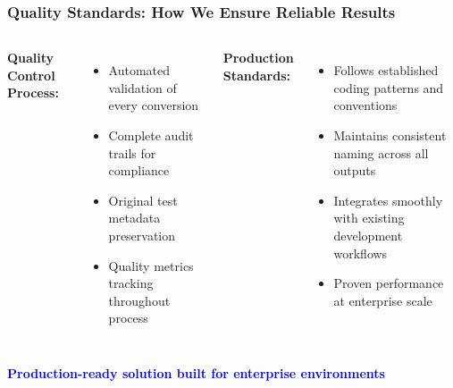 \begin{frame}
\frametitle{Quality Standards: How We Ensure Reliable Results}
\begin{columns}
\textbf{Quality Control Process:}
\begin{itemize}
    \item Automated validation of every conversion
    \item Complete audit trails for compliance
    \item Original test metadata preservation
    \item Quality metrics tracking throughout process
\end{itemize}

\textbf{Production Standards:}
\begin{itemize}
    \item Follows established coding patterns and conventions
    \item Maintains consistent naming across all outputs
    \item Integrates smoothly with existing development workflows
    \item Proven performance at enterprise scale
\end{itemize}
\end{columns}

\vspace{0.3cm}
\begin{center}
\textcolor{blue}{\textbf{Production-ready solution built for enterprise environments}}
\end{center}
\end{frame}

